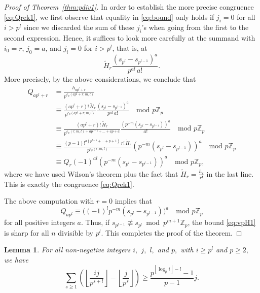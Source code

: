 \documentclass[12pt,reqno]{amsart}
\numberwithin{equation}{section}
\newtheorem{lemma}[theorem]{Lemma}
\theoremstyle{remark}
\begin{document}
\begin{proof}[Proof of Theorem~{\em \ref{thm:pdiv1}}]
In order to establish the more precise congruence
\eqref{eq:Qrek1}, we first observe that equality in \eqref{eq:bound}
only holds if $j_i=0$ for all $i>p^{l}$ since we discarded
the sum of these $j_i$'s when going from the first to the second
expression.
Hence, it suffices to look more carefully at
the summand with $i_0=r$, $j_0=a$, and $j_i=0$ for $i>p^l$,
that is, at
$$
\widetilde H_{r}
\frac {(s_{p^l}-s_{p^{l-1}})^{a}} {p^{a l}\,a!}.
$$
More precisely, by the above considerations, we conclude that
\begin{align*}
Q_{ap^l+r}&=\frac {h_{ap^l+r}} 
{p^{e_p(ap^l+r;m,l)}}\\
&\equiv
\frac {(ap^l+r)!\,\widetilde H_{r}} {p^{e_p(ap^l+r;m,l)}}
\frac {(s_{p^l}-s_{p^{l-1}})^{a}} {p^{a l}\,a!}
\quad \text{mod }p{\mathbb{Z}}_p\\
&\equiv
\frac {(ap^l+r)!\,\widetilde H_{r}} {p^{e_p(r;m,l)+ap^{l-1}+\dots+ap+a}}
\frac {\left(p^{-m}(s_{p^l}-s_{p^{l-1}})\right)^{a}} {a!}
\quad \text{mod }p{\mathbb{Z}}_p\\
&\equiv
\frac {(p-1)!^{a(p^{l-1}+\dots+p+1)}\,r!\,\widetilde H_{r}} 
{p^{e_p(r;m,l)}}
{\left(p^{-m}(s_{p^l}-s_{p^{l-1}})\right)^{a}} 
\quad \text{mod }p{\mathbb{Z}}_p\\
&\equiv
Q_r
(-1)^{al}
{\left(p^{-m}(s_{p^l}-s_{p^{l-1}})\right)^{a}} 
\quad \text{mod }p{\mathbb{Z}}_p,
\end{align*}
where we have used Wilson's theorem plus the fact 
that $\widetilde H_r=\frac {h_r} {r!}$ in the last line.
This is exactly the congruence \eqref{eq:Qrek1}.

The above computation with $r=0$ implies that
\begin{equation*} 
Q_{ap^l}\equiv \big((-1)^lp^{-m}(s_{p^l}-s_{p^{l-1}})\big)^a
\quad \text{mod $p{\mathbb{Z}}_p$}
\end{equation*}
for all positive integers $a$. Thus, if 
\hbox{$s_{p^{l-1}}\not\equiv s_{p^{l}}$~{mod~$p^{m+1}{\mathbb{Z}}_p$}},
the bound \eqref{eq:vpH1} is
sharp for all $n$ divisible by $p^l$.
This completes the proof of the theorem.
\end{proof}

\begin{lemma} \label{lem:ij}
For all non-negative integers $i,$ $j,$ $l,$ and\/ $p,$ with $i\ge p^{l}$
and $p\ge2,$ we have
$$
\sum_{s\ge1}
\left({\left\lfloor{\frac {ij} {p^{s+l}}}\right\rfloor}
-
{\left\lfloor{\frac {j} {p^{s}}}\right\rfloor}\right)
\ge \frac {p^{{\left\lfloor{\log_pi}\right\rfloor}-l}-1} {p-1}j.
$$
\end{lemma}
\end{document}
